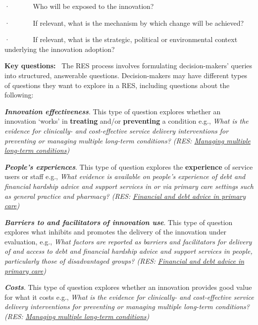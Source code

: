 \documentclass[
  letterpaper,
  DIV=11,
  numbers=noendperiod]{scrreprt}
\begin{document}
·~~~~~~ Who will be exposed to the innovation?

·~~~~~~ If relevant, what is the mechanism by which change will be
achieved?

·~~~~~~ If relevant, what is the strategic, political or environmental
context underlying the innovation adoption?

\textbf{Key questions:} ~The RES process involves formulating
decision-makers' queries into structured, answerable questions.
Decision-makers may have different types of questions they want to
explore in a RES, including questions about the following:

\textbf{\emph{Innovation effectiveness}}. This type of question explores
whether an innovation `works' in \textbf{treating} and/or
\textbf{preventing} a condition e.g., \emph{What is the evidence for
clinically- and cost-effective service delivery interventions for
preventing or managing multiple long-term conditions? (RES:
\href{https://arc-gm.nihr.ac.uk/media/Resources/ARC/Evaluation/RES/Multiple\%20long-term\%20conditions/ARC\%20RES\%20Multiple\%20long\%20term\%20conditions\%20-\%20final\%20report\%20(3).pdf}{Managing
multiple long-term conditions})}

\textbf{\emph{People's experiences}}. This type of question explores the
\textbf{experience} of service users or staff e.g., \emph{What evidence
is available on people's experience of debt and financial hardship
advice and support services in or via primary care settings such as
general practice and pharmacy? (RES:
\href{https://arc-gm.nihr.ac.uk/media/Resources/ARC/Evaluation/RES/Financial\%20Hardship\%20in\%20Primary\%20Care/RES\%20Financial\%20and\%20debt\%20advice\%20in\%20primary\%20care\%20-\%20new\%20template\%20FINAL.pdf}{Financial
and debt advice in primary care})}

\textbf{\emph{Barriers to and facilitators}} \textbf{\emph{of innovation
use}}. This type of question explores what inhibits and promotes the
delivery of the innovation under evaluation, e.g., \emph{What factors
are reported as barriers and facilitators for delivery of and access to
debt and financial hardship advice and support services in people,
particularly those of disadvantaged groups? (RES:
\href{https://arc-gm.nihr.ac.uk/media/Resources/ARC/Evaluation/RES/Financial\%20Hardship\%20in\%20Primary\%20Care/RES\%20Financial\%20and\%20debt\%20advice\%20in\%20primary\%20care\%20-\%20new\%20template\%20FINAL.pdf}{Financial
and debt advice in primary care})}

\textbf{\emph{Costs}}. This type of question explores whether an
innovation provides good value for what it costs e.g., \emph{What is the
evidence for clinically- and cost-effective service delivery
interventions for preventing or managing multiple long-term conditions?
(RES:
\href{https://arc-gm.nihr.ac.uk/media/Resources/ARC/Evaluation/RES/Multiple\%20long-term\%20conditions/ARC\%20RES\%20Multiple\%20long\%20term\%20conditions\%20-\%20final\%20report\%20(3).pdf}{Managing
multiple long-term conditions})}
\end{document}
